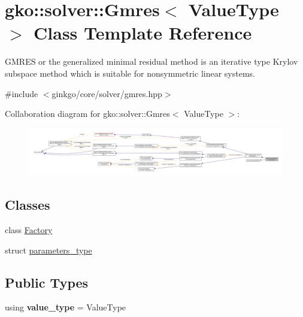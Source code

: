 \hypertarget{classgko_1_1solver_1_1Gmres}{}\section{gko\+:\+:solver\+:\+:Gmres$<$ Value\+Type $>$ Class Template Reference}
\label{classgko_1_1solver_1_1Gmres}


G\+M\+R\+ES or the generalized minimal residual method is an iterative type Krylov subspace method which is suitable for nonsymmetric linear systems.  




{\ttfamily \#include $<$ginkgo/core/solver/gmres.\+hpp$>$}



Collaboration diagram for gko\+:\+:solver\+:\+:Gmres$<$ Value\+Type $>$\+:
\nopagebreak
\begin{figure}[H]
\begin{center}
\leavevmode
\includegraphics[width=350pt]{classgko_1_1solver_1_1Gmres__coll__graph}
\end{center}
\end{figure}
\subsection*{Classes}
\begin{DoxyCompactItemize}
\item 
class \hyperlink{classgko_1_1solver_1_1Gmres_1_1Factory}{Factory}
\item 
struct \hyperlink{structgko_1_1solver_1_1Gmres_1_1parameters__type}{parameters\+\_\+type}
\end{DoxyCompactItemize}
\subsection*{Public Types}
\begin{DoxyCompactItemize}
\item 
\mbox{\label{classgko_1_1solver_1_1Gmres_a0df4f52a85e853e0e09ab5e6a83cdf66}} 
using {\bfseries value\+\_\+type} = Value\+Type
\end{DoxyCompactItemize}
